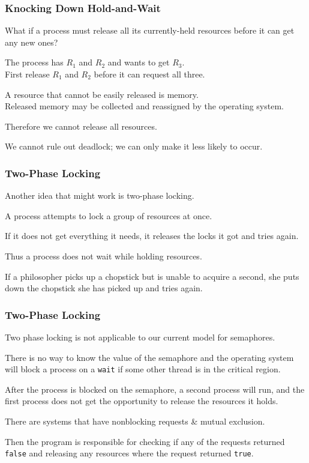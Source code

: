 \begin{frame}
\frametitle{Knocking Down Hold-and-Wait}

What if a process must release all its currently-held resources before it can get any new ones? 

The process has $R_{1}$ and $R_{2}$ and wants to get $R_{3}$.\\
\quad First release $R_{1}$ and $R_{2}$ before it can request all three. 

A resource that cannot be easily released is memory.\\
\quad Released memory may be collected and reassigned by the operating system. 

Therefore we cannot release all resources.

We cannot rule out deadlock; we can only make it less likely to occur.

\end{frame}

\begin{frame}
\frametitle{Two-Phase Locking}

Another idea that might work is \alert{two-phase locking}. 

A process attempts to lock a group of resources at once. 

If it does not get everything it needs, it releases the locks it got and tries again. 

Thus a process does not wait while holding resources. 

If a philosopher picks up a chopstick but is unable to acquire a second, she puts down the chopstick she has picked up and tries again.

\end{frame}

\begin{frame}
\frametitle{Two-Phase Locking}

Two phase locking is not applicable to our current model for semaphores.

There is no way to know the value of the semaphore and the operating system will block a process on a \texttt{wait} if some other thread is in the critical region. 

After the process is blocked on the semaphore, a second process will run, and the first process does not get the opportunity to release the resources it holds. 

There are systems that have nonblocking requests \& mutual exclusion.

Then the program is responsible for checking if any of the requests returned \texttt{false} and releasing any resources where the request returned \texttt{true}.


\end{frame}



